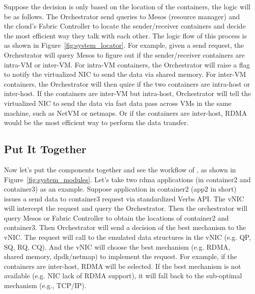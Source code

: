 Suppose the decision is only based on the location of the containers, the logic will be as follows.
The Orchestrator send queries to Mesos (resource manager) and the cloud's Fabric Controller to locate
the sender/receiver containers and decide the most efficient way they talk with each other.
The logic flow of this process is as shown in Figure~\ref{fig:system_locator}.
For example, given a send request, the Orchestrator will query Mesos to figure out if the 
sender/receiver containers are intra-VM or inter-VM. 
For intra-VM containers, the Orchestrator will raise a flag to notify the virtualized NIC to
send the data via shared memory.
For inter-VM containers, the Orchestrator will then quire if the two containers are intra-host
or inter-host.
If the containers are inter-VM but intra-host, Orchestrator will tell the virtualized NIC to send
the data via fast data pass across VMs in the same machine, such as NetVM\cite{} or netmaps\cite{}.
Or if the containers are inter-host, RDMA would be the most efficient way to perform the data transfer.



\subsection{Put It Together}
Now let's put the components together and see the workflow of \sysname, as shown in Figure~\ref{fig:system_modules}.
Let's take two rdma applications (in container2 and container3) as an example.
Suppose application in container2 (app2 in short) issues a send data to container3 request via standardized Verbs API.
The vNIC will intercept the request and query the Orchestrator. 
Then the orchestrator will query Mesos or Fabric Controller to obtain the locations of 
container2 and container3. Then Orchestrator will send a decision of the best mechanism to the vNIC.
The request will call to the emulated data structures in the vNIC (e.g. QP, SQ, RQ, CQ). And the vNIC will choose the
best mechanism (e.g. RDMA, shared memory, dpdk/netmap) to implement the request. For example, if the containers
are inter-host, RDMA will be selected. If the best mechanism is not available (e.g. NIC lack of RDMA support), it will
fall back to the sub-optimal mechanism (e.g., TCP/IP).

\fi